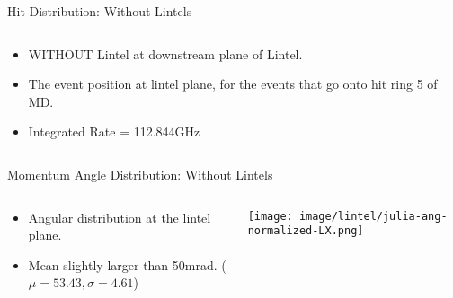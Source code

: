 \documentclass[aspectratio=1610]{beamer}
\begin{document}
\begin{frame}{Hit Distribution: Without Lintels}
    \begin{columns}
        \begin{column}{0.39\textwidth}
            \begin{itemize}
                \item WITHOUT Lintel at downstream plane of Lintel.
                \item The event position at lintel plane, for the events that go onto hit ring 5 of MD.
                \item Integrated Rate = 112.844GHz
            \end{itemize}
        \end{column}
        \begin{column}{0.59\textwidth}
        \end{column}
    \end{columns}
\end{frame}
%
%
\begin{frame}{Momentum Angle Distribution: Without Lintels}
    \begin{columns}
        \begin{column}{0.39\textwidth}
            \begin{itemize}
                \item Angular distribution at the lintel plane.
                \item Mean slightly larger than 50mrad. ($\mu = 53.43, \sigma = 4.61$)
            \end{itemize}
        \end{column}
        \begin{column}{0.59\textwidth}
            \texttt{[image: image/lintel/julia-ang-normalized-LX.png]}
        \end{column}
    \end{columns}
\end{frame}
%
%
\end{document}
